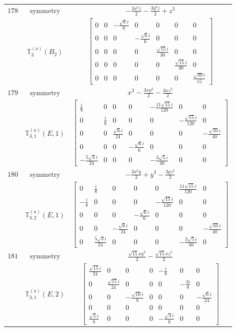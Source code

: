 \documentclass[fleqn,8pt,landscape]{jsarticle}
\begin{document}
\begin{longtable}{ccc}
$ 178 $ & $ \text{symmetry} $ & $ - \frac{3 x^{2} z}{2} - \frac{3 y^{2} z}{2} + z^{3} $ \\
$  $ & $ \mathbb{T}_{3}^{(a)}(B_{2}) $ & $ \begin{bmatrix} 0 & 0 & - \frac{\sqrt{6} i}{6} & 0 & 0 & 0 & 0 \\ 0 & 0 & 0 & - \frac{\sqrt{6} i}{6} & 0 & 0 & 0 \\ 0 & 0 & 0 & 0 & \frac{\sqrt{15} i}{30} & 0 & 0 \\ 0 & 0 & 0 & 0 & 0 & \frac{\sqrt{15} i}{30} & 0 \\ 0 & 0 & 0 & 0 & 0 & 0 & \frac{\sqrt{30} i}{15} \end{bmatrix} $ \\ \hline
$ 179 $ & $ \text{symmetry} $ & $ x^{3} - \frac{3 x y^{2}}{2} - \frac{3 x z^{2}}{2} $ \\
$  $ & $ \mathbb{T}_{3,1}^{(a)}(E,1) $ & $ \begin{bmatrix} \frac{i}{8} & 0 & 0 & 0 & - \frac{11 \sqrt{15} i}{120} & 0 & 0 \\ 0 & \frac{i}{8} & 0 & 0 & 0 & - \frac{\sqrt{15} i}{120} & 0 \\ 0 & 0 & \frac{\sqrt{6} i}{24} & 0 & 0 & 0 & - \frac{\sqrt{10} i}{40} \\ 0 & 0 & 0 & - \frac{\sqrt{6} i}{6} & 0 & 0 & 0 \\ - \frac{5 \sqrt{3} i}{24} & 0 & 0 & 0 & - \frac{3 \sqrt{5} i}{40} & 0 & 0 \end{bmatrix} $ \\ \hline
$ 180 $ & $ \text{symmetry} $ & $ - \frac{3 x^{2} y}{2} + y^{3} - \frac{3 y z^{2}}{2} $ \\
$  $ & $ \mathbb{T}_{3,2}^{(a)}(E,1) $ & $ \begin{bmatrix} 0 & \frac{i}{8} & 0 & 0 & 0 & \frac{11 \sqrt{15} i}{120} & 0 \\ - \frac{i}{8} & 0 & 0 & 0 & - \frac{\sqrt{15} i}{120} & 0 & 0 \\ 0 & 0 & 0 & - \frac{\sqrt{6} i}{6} & 0 & 0 & 0 \\ 0 & 0 & - \frac{\sqrt{6} i}{24} & 0 & 0 & 0 & - \frac{\sqrt{10} i}{40} \\ 0 & \frac{5 \sqrt{3} i}{24} & 0 & 0 & 0 & - \frac{3 \sqrt{5} i}{40} & 0 \end{bmatrix} $ \\ \hline
$ 181 $ & $ \text{symmetry} $ & $ \frac{\sqrt{15} x y^{2}}{2} - \frac{\sqrt{15} x z^{2}}{2} $ \\
$  $ & $ \mathbb{T}_{3,1}^{(a)}(E,2) $ & $ \begin{bmatrix} \frac{\sqrt{15} i}{24} & 0 & 0 & 0 & - \frac{i}{8} & 0 & 0 \\ 0 & \frac{\sqrt{15} i}{24} & 0 & 0 & 0 & - \frac{3 i}{8} & 0 \\ 0 & 0 & - \frac{\sqrt{10} i}{8} & 0 & 0 & 0 & - \frac{\sqrt{6} i}{24} \\ 0 & 0 & 0 & 0 & 0 & 0 & 0 \\ \frac{\sqrt{5} i}{8} & 0 & 0 & 0 & - \frac{\sqrt{3} i}{8} & 0 & 0 \end{bmatrix} $ \\ \hline

\end{longtable}
\end{document}
